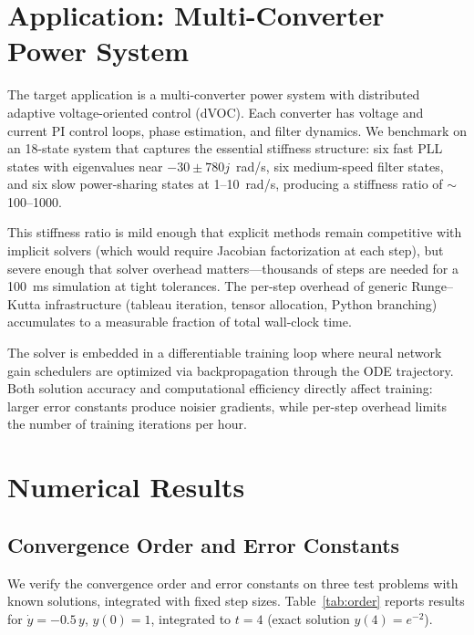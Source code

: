 \documentclass[11pt]{article}
\begin{document}
\section{Application: Multi-Converter Power System}
\label{sec:application}

The target application is a multi-converter power system with
distributed adaptive voltage-oriented control (dVOC).  Each converter
has voltage and current PI control loops, phase estimation, and filter
dynamics.  We benchmark on an 18-state system that captures the
essential stiffness structure: six fast PLL states with eigenvalues
near $-30 \pm 780j$~rad/s, six medium-speed filter states, and six
slow power-sharing states at 1--10~rad/s, producing a stiffness ratio
of $\sim$100--1000.

This stiffness ratio is mild enough that explicit methods remain
competitive with implicit solvers (which would require Jacobian
factorization at each step), but severe enough that solver overhead
matters---thousands of steps are needed for a 100~ms simulation at
tight tolerances.  The per-step overhead of generic Runge--Kutta
infrastructure (tableau iteration, tensor allocation, Python branching)
accumulates to a measurable fraction of total wall-clock time.

The solver is embedded in a differentiable training loop where neural
network gain schedulers are optimized via backpropagation through the
ODE trajectory.  Both solution accuracy and computational efficiency
directly affect training: larger error constants produce noisier
gradients, while per-step overhead limits the number of training
iterations per hour.

\section{Numerical Results}
\label{sec:results}

\subsection{Convergence Order and Error Constants}

We verify the convergence order and error constants on three test
problems with known solutions, integrated with fixed step sizes.
Table~\ref{tab:order} reports results for $\dot{y} = -0.5\,y$,
$y(0) = 1$, integrated to $t = 4$ (exact solution $y(4) = e^{-2}$).
\end{document}
